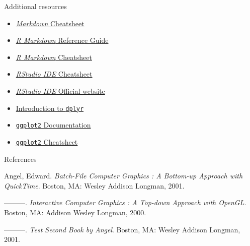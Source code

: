 \documentclass{beamer}
\newenvironment{CSLReferences}[2]
  {}
  {\par}
\providecommand{\tightlist}{\setlength{\itemsep}{0pt}\setlength{\parskip}{0pt}}
\begin{document}
\begin{frame}[fragile]{Additional resources}
\protect\hypertarget{additional-resources}{}
\begin{itemize}
\tightlist
\item
  \href{https://github.com/adam-p/markdown-here/wiki/Markdown-Cheatsheet}{\emph{Markdown}
  Cheatsheet}
\item
  \href{https://www.rstudio.com/wp-content/uploads/2015/03/rmarkdown-reference.pdf}{\emph{R
  Markdown} Reference Guide}
\item
  \href{https://github.com/rstudio/cheatsheets/raw/master/rmarkdown-2.0.pdf}{\emph{R
  Markdown} Cheatsheet}
\item
  \href{https://github.com/rstudio/cheatsheets/raw/master/rstudio-ide.pdf}{\emph{RStudio
  IDE} Cheatsheet}
\item
  \href{https://rstudio.com/products/rstudio/}{\emph{RStudio IDE}
  Official website}
\item
  \href{https://cran.rstudio.com/web/packages/dplyr/vignettes/dplyr.html}{Introduction
  to \texttt{dplyr}}
\item
  \href{https://ggplot2.tidyverse.org/}{\texttt{ggplot2} Documentation}
\item
  \href{https://github.com/rstudio/cheatsheets/raw/master/data-visualization-2.1.pdf}{\texttt{ggplot2}
  Cheatsheet}
\end{itemize}
\end{frame}

\begin{frame}{References}
\protect\hypertarget{references}{}

\noindent

\hypertarget{refs}{}
\begin{CSLReferences}{1}{0}
\leavevmode\hypertarget{ref-angel2001}{}%
Angel, Edward. \emph{Batch-File Computer Graphics : A Bottom-up Approach
with QuickTime}. Boston, MA: Wesley Addison Longman, 2001.

\leavevmode\hypertarget{ref-angel2000}{}%
---------. \emph{Interactive Computer Graphics : A Top-down Approach
with OpenGL}. Boston, MA: Addison Wesley Longman, 2000.

\leavevmode\hypertarget{ref-angel2002a}{}%
---------. \emph{Test Second Book by Angel}. Boston, MA: Wesley Addison
Longman, 2001.

\end{CSLReferences}
\end{frame}
\end{document}
